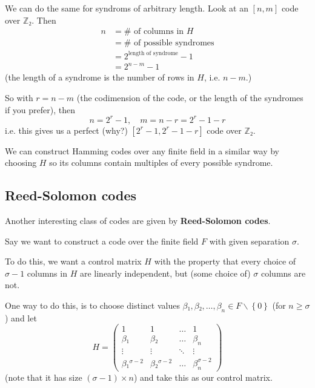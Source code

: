 \documentclass[english]{lbscript}
\begin{document}
We can do the same for syndroms of arbitrary length. Look at an \([n, m]\) code over \(ℤ₂\). Then
\begin{align}
	\label{eq:152}
	n & = \# \text{ of columns in } H       \\
	  & = \# \text{ of possible syndromes}  \\
	  & = 2^{\text{length of syndrome}} - 1 \\
	  & = 2^{n-m} - 1
\end{align}
(the length of a syndrome is the number of rows in \(H\), i.e. \(n-m\).)

So with \(r=n-m\) (the codimension of the code, or the length of the syndromes if you prefer), then
\begin{equation}
	\label{eq:153}
	n=2^{r}-1, \quad m = n-r = 2^{r}-1 -r
\end{equation}
i.e. this gives us a perfect (why?) \([2^{r}-1, 2^{r}-1-r]\) code over \(ℤ₂\).

\begin{remark}{}{}
	We can construct Hamming codes over any finite field in  a similar way by choosing \(H\) so its columns contain multiples of every possible syndrome.
\end{remark}

\subsection{Reed-Solomon codes}
\label{sec:reed-solomon-codes}

Another interesting class of codes are given by \textbf{Reed-Solomon codes}.

Say we want to construct a code over the finite field \(F\) with given separation \(𝜎\).

To do this, we want a control matrix \(H\) with the property that every choice of \(𝜎-1\) columns in \(H\) are linearly independent, but (some choice of) \(𝜎\) columns are not.

One way to do this, is to choose distinct values \(𝛽₁, 𝛽₂, \dots, 𝛽_{n}∈F∖\left\{0 \right\}\) (for \(n≥𝜎\)) and let
\begin{equation}
	\label{eq:154}
	H = \begin{pmatrix}
		1        & 1        & \dots  & 1           \\
		𝛽₁       & 𝛽₂       & \dots  & 𝛽_{n}       \\
		\vdots   & \vdots   & \ddots & \vdots      \\
		𝛽₁^{𝜎-2} & 𝛽₂^{𝜎-2} & \dots  & 𝛽_{n}^{𝜎-2}
	\end{pmatrix}
\end{equation}
(note that it has size \((𝜎-1)×n\)) and take this as our control matrix.
\end{document}
